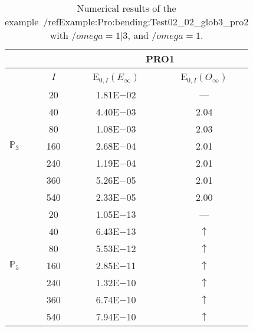 \begin{table}[H]
\caption{Numerical results of the example~/ref{Example:Pro:bending:Test02_02_glob3_pro2} with $/omega=1|3$, and $/omega=1$.}
\setlength{\tabcolsep}{5pt}
\centering
\begin{tabular}{@{}l c c c@{}}
\toprule
 &  & \multicolumn{2}{c}{PRO1}\\
\midrule
 & $I$ & E$_{0,I}(E_{\infty})$ & E$_{0,I}(O_{\infty})$\\
\midrule
\multirow{7}{*}{$\mathbb{P}_{3}$}
 & 20 & 1.81E$-$02 & ---\\
 & 40 & 4.40E$-$03 & 2.04\\
 & 80 & 1.08E$-$03 & 2.03\\
 & 160 & 2.68E$-$04 & 2.01\\
 & 240 & 1.19E$-$04 & 2.01\\
 & 360 & 5.26E$-$05 & 2.01\\
 & 540 & 2.33E$-$05 & 2.00\\
\midrule
\multirow{7}{*}{$\mathbb{P}_{5}$}
 & 20 & 1.05E$-$13 & ---\\
 & 40 & 6.43E$-$13 & $\uparrow$\\
 & 80 & 5.53E$-$12 & $\uparrow$\\
 & 160 & 2.85E$-$11 & $\uparrow$\\
 & 240 & 1.32E$-$10 & $\uparrow$\\
 & 360 & 6.74E$-$10 & $\uparrow$\\
 & 540 & 7.94E$-$10 & $\uparrow$\\
\bottomrule
\end{tabular}
\label{Table:PRO:test_02_02_test10_pro2}
\end{table}
